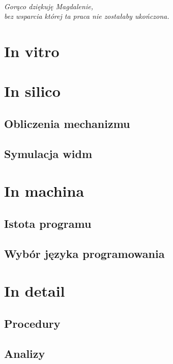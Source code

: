 \documentclass[a4paper, justified, nobib]{tufte-book}
\begin{document}
\frontmatter
\maketitle

\cleardoublepage
\thispagestyle{empty}
~\vfill
\vfill
\begin{fullwidth}
\begin{doublespace}
\raggedleft\noindent\fontsize{16}{20}\selectfont\itshape
\nohyphenation
Gorąco dziękuję Magdalenie,\\
bez wsparcia której ta praca nie zostałaby ukończona.
\end{doublespace}
\end{fullwidth}
\vfill

\tableofcontents



\mainmatter


\chapter{In vitro}

\chapter{In silico}
\section{Obliczenia mechanizmu}
\section{Symulacja widm}

\chapter{In machina}
\section{Istota programu}
\section{Wybór języka programowania}

\chapter{In detail}
\section{Procedury}
\section{Analizy}

\backmatter

\end{document}
